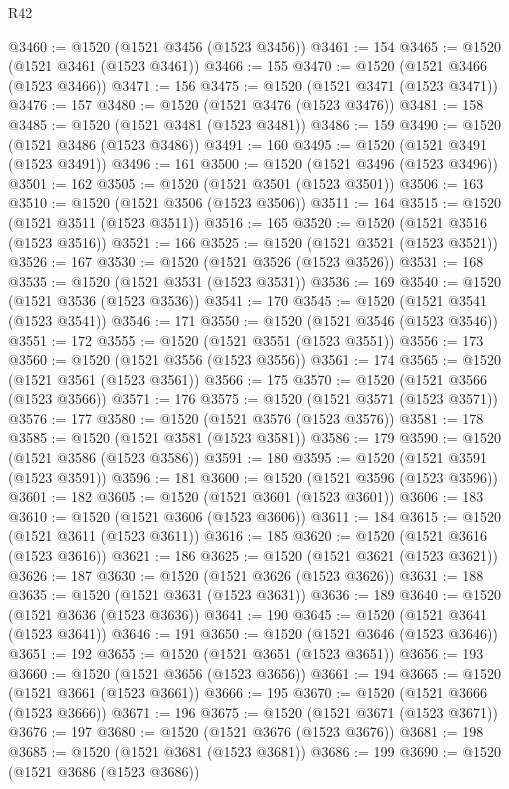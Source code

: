 \begin{lexlean}{R42}
\begin{coremodule}
{@3460 := @1520 (@1521 @3456 (@1523 @3456))
@3461 := 154
@3465 := @1520 (@1521 @3461 (@1523 @3461))
@3466 := 155
@3470 := @1520 (@1521 @3466 (@1523 @3466))
@3471 := 156
@3475 := @1520 (@1521 @3471 (@1523 @3471))
@3476 := 157
@3480 := @1520 (@1521 @3476 (@1523 @3476))
@3481 := 158
@3485 := @1520 (@1521 @3481 (@1523 @3481))
@3486 := 159
@3490 := @1520 (@1521 @3486 (@1523 @3486))
@3491 := 160
@3495 := @1520 (@1521 @3491 (@1523 @3491))
@3496 := 161
@3500 := @1520 (@1521 @3496 (@1523 @3496))
@3501 := 162
@3505 := @1520 (@1521 @3501 (@1523 @3501))
@3506 := 163
@3510 := @1520 (@1521 @3506 (@1523 @3506))
@3511 := 164
@3515 := @1520 (@1521 @3511 (@1523 @3511))
@3516 := 165
@3520 := @1520 (@1521 @3516 (@1523 @3516))
@3521 := 166
@3525 := @1520 (@1521 @3521 (@1523 @3521))
@3526 := 167
@3530 := @1520 (@1521 @3526 (@1523 @3526))
@3531 := 168
@3535 := @1520 (@1521 @3531 (@1523 @3531))
@3536 := 169
@3540 := @1520 (@1521 @3536 (@1523 @3536))
@3541 := 170
@3545 := @1520 (@1521 @3541 (@1523 @3541))
@3546 := 171
@3550 := @1520 (@1521 @3546 (@1523 @3546))
@3551 := 172
@3555 := @1520 (@1521 @3551 (@1523 @3551))
@3556 := 173
@3560 := @1520 (@1521 @3556 (@1523 @3556))
@3561 := 174
@3565 := @1520 (@1521 @3561 (@1523 @3561))
@3566 := 175
@3570 := @1520 (@1521 @3566 (@1523 @3566))
@3571 := 176
@3575 := @1520 (@1521 @3571 (@1523 @3571))
@3576 := 177
@3580 := @1520 (@1521 @3576 (@1523 @3576))
@3581 := 178
@3585 := @1520 (@1521 @3581 (@1523 @3581))
@3586 := 179
@3590 := @1520 (@1521 @3586 (@1523 @3586))
@3591 := 180
@3595 := @1520 (@1521 @3591 (@1523 @3591))
@3596 := 181
@3600 := @1520 (@1521 @3596 (@1523 @3596))
@3601 := 182
@3605 := @1520 (@1521 @3601 (@1523 @3601))
@3606 := 183
@3610 := @1520 (@1521 @3606 (@1523 @3606))
@3611 := 184
@3615 := @1520 (@1521 @3611 (@1523 @3611))
@3616 := 185
@3620 := @1520 (@1521 @3616 (@1523 @3616))
@3621 := 186
@3625 := @1520 (@1521 @3621 (@1523 @3621))
@3626 := 187
@3630 := @1520 (@1521 @3626 (@1523 @3626))
@3631 := 188
@3635 := @1520 (@1521 @3631 (@1523 @3631))
@3636 := 189
@3640 := @1520 (@1521 @3636 (@1523 @3636))
@3641 := 190
@3645 := @1520 (@1521 @3641 (@1523 @3641))
@3646 := 191
@3650 := @1520 (@1521 @3646 (@1523 @3646))
@3651 := 192
@3655 := @1520 (@1521 @3651 (@1523 @3651))
@3656 := 193
@3660 := @1520 (@1521 @3656 (@1523 @3656))
@3661 := 194
@3665 := @1520 (@1521 @3661 (@1523 @3661))
@3666 := 195
@3670 := @1520 (@1521 @3666 (@1523 @3666))
@3671 := 196
@3675 := @1520 (@1521 @3671 (@1523 @3671))
@3676 := 197
@3680 := @1520 (@1521 @3676 (@1523 @3676))
@3681 := 198
@3685 := @1520 (@1521 @3681 (@1523 @3681))
@3686 := 199
@3690 := @1520 (@1521 @3686 (@1523 @3686))
}
\end{coremodule}
\end{lexlean}
